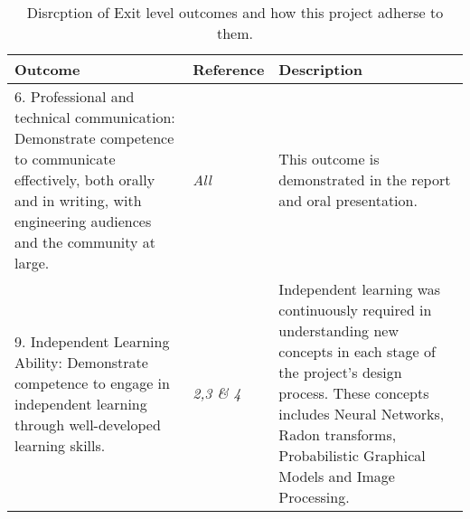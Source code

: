 \begin{table}
\caption{Disrcption of Exit level outcomes and how this project adherse to them.} \label{tbl:ECSATable2}
\begin{tabular}{|p{6cm}|p{3cm}|p{6cm}|}
\hline
\textbf{Outcome}&\textbf{Reference}&\textbf{Description}\\
\hline
6. Professional and technical communication: Demonstrate competence to communicate effectively, both orally and
in writing, with engineering audiences and the community at large. & \textit{All}  &   This outcome is demonstrated in the report and oral presentation.       \\
\hline
9. Independent Learning Ability: Demonstrate competence to engage in independent learning through well-developed
learning skills.&\textit{2,3 \& 4}  &  Independent learning was continuously required in understanding new concepts in each stage of the project's design process. These concepts includes Neural Networks, Radon transforms, Probabilistic Graphical Models and Image Processing.\\
\hline
\end{tabular}
\end{table}

